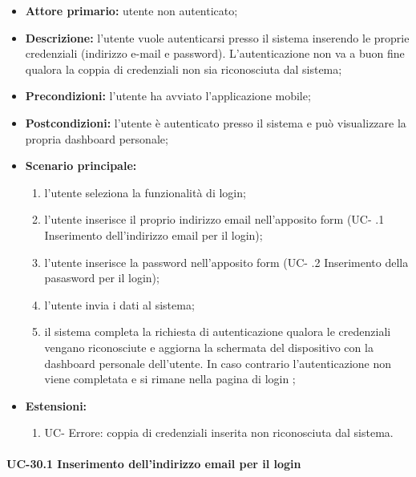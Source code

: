 	\begin{itemize}
		\item \textbf{Attore primario:} utente non autenticato;

		\item \textbf{Descrizione:} l'utente vuole autenticarsi presso il sistema inserendo le proprie credenziali (indirizzo e-mail e password). L'autenticazione non va a buon fine qualora la coppia di credenziali non sia riconosciuta dal sistema;

		\item \textbf{Precondizioni:} l'utente ha avviato l'applicazione mobile;

		\item \textbf{Postcondizioni:} l'utente è autenticato presso il sistema e può visualizzare la propria dashboard personale;

		\item \textbf{Scenario principale:}
	  		\begin{enumerate}
		  		\item l'utente seleziona la funzionalità di login;
		  		\item l'utente inserisce il proprio indirizzo email nell'apposito form (UC- .1 Inserimento dell'indirizzo email per il login);
		  		\item l'utente inserisce la password nell'apposito form (UC- .2 Inserimento della pasasword per il login);
		  		\item l'utente invia i dati al sistema;
		  		\item il sistema completa la richiesta di autenticazione qualora le credenziali vengano riconosciute e aggiorna la schermata del dispositivo con la dashboard personale dell'utente. In caso contrario l'autenticazione non viene completata e si rimane nella pagina di login ;
	  		\end{enumerate}
	  	\item \textbf{Estensioni:}
	  		\begin{enumerate}
		  		\item UC- Errore: coppia di credenziali inserita non riconosciuta dal sistema.
	  		\end{enumerate}
	\end{itemize}


\paragraph{UC-30.1 Inserimento dell'indirizzo email per il login}

